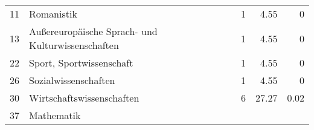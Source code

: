 \begin{longtable}{lXrrr}
     11 &
     \multicolumn{1}{X}{ Romanistik   } &


       \num{1} &
       \num[round-mode=places,round-precision=2]{4,55} &
         \num[round-mode=places,round-precision=2]{0} \\

     13 &
     \multicolumn{1}{X}{ Außereuropäische Sprach- und Kulturwissenschaften   } &


       \num{1} &
       \num[round-mode=places,round-precision=2]{4,55} &
         \num[round-mode=places,round-precision=2]{0} \\

     22 &
     \multicolumn{1}{X}{ Sport, Sportwissenschaft   } &


       \num{1} &
       \num[round-mode=places,round-precision=2]{4,55} &
         \num[round-mode=places,round-precision=2]{0} \\

     26 &
     \multicolumn{1}{X}{ Sozialwissenschaften   } &


       \num{1} &
       \num[round-mode=places,round-precision=2]{4,55} &
         \num[round-mode=places,round-precision=2]{0} \\

     30 &
     \multicolumn{1}{X}{ Wirtschaftswissenschaften   } &


       \num{6} &
       \num[round-mode=places,round-precision=2]{27,27} &
         \num[round-mode=places,round-precision=2]{0,02} \\

     37 &
     \multicolumn{1}{X}{ Mathematik   } &



\end{longtable}
